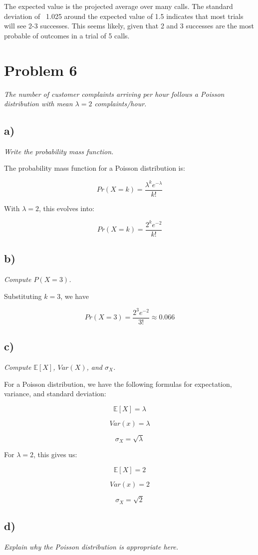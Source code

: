 \documentclass[11pt, oneside]{article}   	%
\begin{document}
The expected value is the projected average over many calls. The standard deviation of ~1.025 around the expected value of 1.5 indicates that most trials will see 2-3 successes. This seems likely, given that 2 and 3 successes are the most probable of outcomes in a trial of 5 calls.

\section*{Problem 6}
\emph{The number of customer complaints arriving per hour follows a Poisson distribution with mean $\lambda = 2$ complaints/hour.}
\subsection*{a)}
\emph{Write the probability mass function.}

The probability mass function for a Poisson distribution is:

$$
Pr(X=k) = \frac{\lambda^ke^{-\lambda}}{k!}
$$

With $\lambda = 2$, this evolves into:

$$
Pr(X=k) = \frac{2^ke^{-2}}{k!}
$$

\subsection*{b)}
\emph{Compute $P(X=3)$.}

Substituting $k=3$, we have

$$
Pr(X=3) = \frac{2^3e^{-2}}{3!} \approx 0.066
$$

\subsection*{c)}
\emph{Compute $\mathbb{E}[X]$, $Var(X)$, and $\sigma_X$.}

For a Poisson distribution, we have the following formulas for expectation, variance, and standard deviation:

$$
\mathbb{E}[X] = \lambda
$$

$$
Var(x) = \lambda
$$

$$
\sigma_X = \sqrt{\lambda}
$$

For $\lambda = 2$, this gives us:

$$
\mathbb{E}[X] = 2
$$

$$
Var(x) = 2
$$

$$
\sigma_X = \sqrt{2}
$$

\subsection*{d)}
\emph{Explain why the Poisson distribution is appropriate here.}
\end{document}

